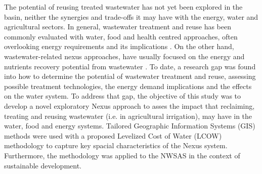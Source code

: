 The potential of reusing treated wastewater has not yet been explored in the basin, neither the synergies and trade-offs it may have with the energy, water and agricultural sectors. In general, wastewater treatment and reuse has been commonly evaluated with water, food and health centred approaches, often overlooking energy requirements and its implications \cite{unescoWastewaterUntappedResource2017,hettiarachchiSAFEUSEWASTEWATERa,cheniniEvaluationThreeDecades2011,qadirNonconventionalWaterResources2007}. On the other hand, wastewater-related nexus approaches, have usually focused on the energy and nutrients recovery potential from wastewater \cite{guestNewPlanningDesign2009,gremillionWastewaterResourceWaterWasteEnergy,unescoWastewaterUntappedResource2017}. To date, a research gap was found into how to determine the potential of wastewater treatment and reuse, assessing possible treatment technologies, the energy demand implications and the effects on the water system. To address that gap, the objective of this study was to develop a novel exploratory Nexus approach to asses the impact that reclaiming, treating and reusing wastewater (i.e. in agricultural irrigation), may have in the water, food and energy systems. Tailored Geographic Information Systems (GIS) methods were used with a proposed Levelized Cost of Water (LCOW) methodology to capture key spacial characteristics of the Nexus system. Furthermore, the methodology was applied to the NWSAS in the context of sustainable development.